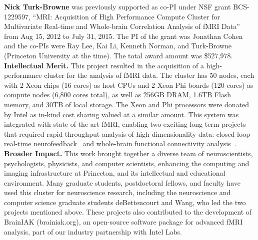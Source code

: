 

\textbf{Nick Turk-Browne} was previously supported as co-PI under NSF
grant BCS-1229597, ``MRI: Acquisition of High Performance Compute
Cluster for Multivariate Real-time and Whole-brain Correlation
Analysis of fMRI Data'' from Aug 15, 2012 to July 31, 2015. The PI
of the grant was Jonathan Cohen and the co-PIs were Ray Lee, Kai Li,
Kenneth Norman, and Turk-Browne (Princeton University at the
time). The total award amount was \$527,978.
{\bf Intellectual Merit.} This project resulted in the acquisition of
a high-performance cluster for the analysis of fMRI data.
The cluster has 50 nodes, each with 2 Xeon chips
(16 cores) as host CPUs and 2 Xeon Phi boards (120 cores) as compute nodes (6,800 cores total), as well as 256GB DRAM, 1.6TB Flash memory, and
30TB of local storage.
The Xeon and Phi processors were donated by Intel as
in-kind cost sharing valued at a similar amount. 
This system was integrated with state-of-the-art fMRI, enabling two
exciting long-term projects that required rapid-throughput analysis of
high-dimensionality data: closed-loop real-time neurofeedback~\citep{deBettencourt:2015} and
whole-brain functional connectivity analysis~\citep{Wang:2015}.
{\bf Broader Impact.} This work brought together a diverse team of
neuroscientists, psychologists, physicists, and computer scientists,
enhancing the computing and imaging infrastructure at
Princeton, and its intellectual and educational environment. Many
graduate students, postdoctoral fellows, and faculty have used this
cluster for neuroscience research, including the neuroscience and
computer science graduate students deBettencourt and Wang, who led
the two projects mentioned above. These projects also contributed to the
development of BrainIAK (brainiak.org), an open-source software package
for advanced fMRI analysis, part of our industry partnership with Intel Labs.

%
%

